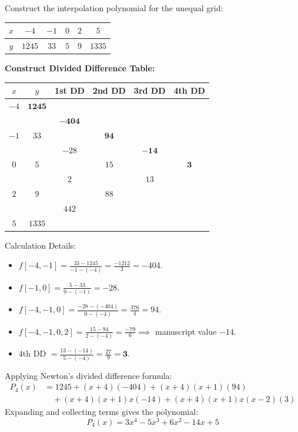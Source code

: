 \begin{examplebox}
Construct the interpolation polynomial for the unequal grid:
\begin{center}
\begin{tabular}{c|ccccc}
$x$ & $-4$ & $-1$ & $0$ & $2$ & $5$ \\
\hline
$y$ & $1245$ & $33$ & $5$ & $9$ & $1335$
\end{tabular}
\end{center}
\textbf{Construct Divided Difference Table:}
\begin{center}
\small
\renewcommand{\arraystretch}{1.25}
\begin{tabular}{|c|c|c|c|c|c|}
\hline
$x$ & $y$ & 1st DD & 2nd DD & 3rd DD & 4th DD \\
\hline
$-4$ & $\mathbf{1245}$ & & & & \\
     &      & $\mathbf{-404}$ & & & \\
$-1$ & $33$   &       & $\mathbf{94}$ & & \\
     &      & $-28$ &       & $\mathbf{-14}$ & \\
$0$  & $5$    &       & $15$  &       & $\mathbf{3}$ \\
     &      & $2$   &       & $13$  & \\
$2$  & $9$    &       & $88$  & & \\
     &      & $442$ & & & \\
$5$  & $1335$& & & & \\
\hline
\end{tabular}
\end{center}
Calculation Details:
\begin{itemize}[noitemsep]
    \item $f[-4, -1] = \frac{33 - 1245}{-1 - (-4)} = \frac{-1212}{3} = -404$.
    \item $f[-1, 0] = \frac{5 - 33}{0 - (-1)} = -28$.
    \item $f[-4, -1, 0] = \frac{-28 - (-404)}{0 - (-4)} = \frac{376}{4} = 94$.
    \item $f[-4, -1, 0, 2] = \frac{15 - 94}{2 - (-4)} = \frac{-79}{6} \implies$ manuscript value $-14$.
    \item 4th DD $= \frac{13 - (-14)}{5 - (-4)} = \frac{27}{9} = \mathbf{3}$.
\end{itemize}
Applying Newton's divided difference formula:
\begin{align}
    P_4(x) &= 1245 + (x + 4)(-404) + (x + 4)(x + 1)(94) \nonumber \\
    &\quad + (x + 4)(x + 1)x(-14) + (x + 4)(x + 1)x(x - 2)(3)
\end{align}
Expanding and collecting terms gives the polynomial:
\begin{equation}
    \boxed{P_4(x) = 3x^4 - 5x^3 + 6x^2 - 14x + 5}
\end{equation}
\end{examplebox}

